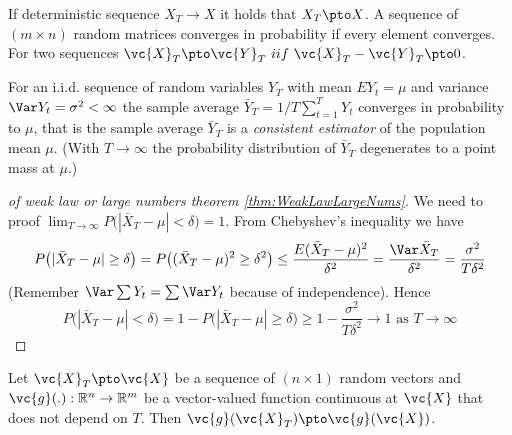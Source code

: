 If deterministic sequence $X_T \to X$ it holds that $X_T \pto X$.
A sequence of $(m \times n)$ random matrices converges in probability if every element converges.
For two sequences $\vc{X}_T \pto \vc{Y}_T \ iif \ \vc{X}_T-\vc{Y}_T \pto 0$.

\begin{theorem}\label{thm:WeakLawLargeNums}
For an i.i.d. sequence of random variables $Y_T$ with mean $E Y_t = \mu$ and variance $\Var Y_t = \sigma^2 < \infty$ the sample average $\bar{Y}_T = 1/T \sum_{t=1}^T Y_t$ converges in probability to $\mu$, that is the sample average $\bar{Y}_T$ is a \emph{consistent estimator} of the population mean $\mu$.
(With $T \to \infty$ the probability distribution of $\bar{Y}_T$ degenerates to a point mass at $\mu$.)
\end{theorem}

\begin{proof}[of weak law or large numbers theorem \ref{thm:WeakLawLargeNums}]
We need to proof $\lim_{T \to \infty} P\big(|\bar{X}_T - \mu| < \delta \big) = 1$.
From Chebyshev's inequality we have
\begin{equation*}
P\big(|\bar{X}_T - \mu| \ge \delta \big) = P\big((\bar{X}_T - \mu)^2 \ge \delta^2 \big) \le \frac{E(\bar{X}_T - \mu)^2}{\delta^2} = \frac{\Var \bar{X}_T}{\delta^2} = \frac{\sigma^2}{T \delta^2}
\end{equation*}
(Remember $\Var \sum Y_t  = \sum \Var Y_t$ because of independence). Hence
\begin{equation*}
P\big(|\bar{X}_T - \mu| < \delta \big) = 1 - P\big(|\bar{X}_T - \mu| \ge \delta \big) \ge 1 - \frac{\sigma^2}{T \delta^2}  \to 1 \text{ as } T \to \infty
\end{equation*}
\end{proof}

\begin{proposition}\label{prop:funcProbConv}
Let $\vc{X}_T \pto \vc{X}$ be a sequence of $(n \times 1)$ random vectors and $\vc{g}(.): \mathbb{R}^n \to \mathbb{R}^m$ be a vector-valued function continuous at $\vc{X}$ that does not depend on $T$.
Then $\vc{g}(\vc{X}_T) \pto \vc{g}(\vc{X})$.
\end{proposition}

